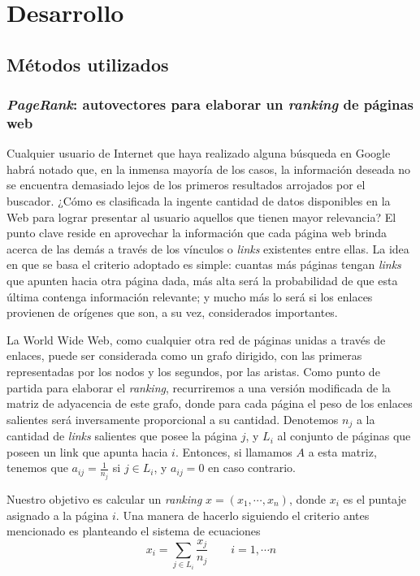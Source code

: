 \section{Desarrollo}

    \subsection{Métodos utilizados}

        \subsubsection{\emph{PageRank}: autovectores para elaborar un \emph{ranking} de páginas web}

        Cualquier usuario de Internet que haya realizado alguna búsqueda en Google habrá notado que, en la inmensa mayoría de los casos, la información deseada no se encuentra demasiado lejos de los primeros resultados arrojados por el buscador. ¿Cómo es clasificada la ingente cantidad de datos disponibles en la Web para lograr presentar al usuario aquellos que tienen mayor relevancia? El punto clave reside en aprovechar la información que cada página web brinda acerca de las demás a través de los vínculos o \emph{links} existentes entre ellas. La idea en que se basa el criterio adoptado es simple: cuantas más páginas tengan \emph{links} que apunten hacia otra página dada, más alta será la probabilidad de que esta última contenga información relevante; y mucho más lo será si los enlaces provienen de orígenes que son, a su vez, considerados importantes.

        La World Wide Web, como cualquier otra red de páginas unidas a través de enlaces, puede ser considerada como un grafo dirigido, con las primeras representadas por los nodos y los segundos, por las aristas. Como punto de partida para elaborar el \emph{ranking}, recurriremos a una versión modificada de la matriz de adyacencia de este grafo, donde para cada página el peso de los enlaces salientes será inversamente proporcional a su cantidad. Denotemos $n_{j}$ a la cantidad de \emph{links} salientes que posee la página $j$, y $L_i$ al conjunto de páginas que poseen un link que apunta hacia $i$. Entonces, si llamamos $A$ a esta matriz, tenemos que $a_{ij} = \frac{1}{n_{j}}$ si $j \in L_i$, y $a_{ij} = 0$ en caso contrario.

        Nuestro objetivo es calcular un \emph{ranking} $x = (x_1, \cdots, x_n)$, donde $x_i$ es el puntaje asignado a la página $i$. Una manera de hacerlo siguiendo el criterio antes mencionado es planteando el sistema de ecuaciones
        \[ x_i = \sum_{j \in L_i} \frac{x_j}{n_j} \qquad i = 1, \cdots n \]

